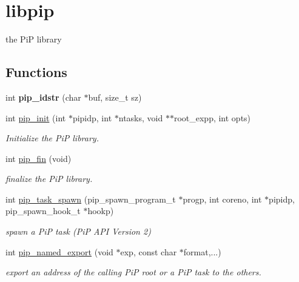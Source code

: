 \hypertarget{group__libpip}{\section{libpip}
\label{group__libpip}
}


the Pi\-P library  


\subsection*{Functions}
\begin{DoxyCompactItemize}
\item 
\hypertarget{group__libpip_ga7c8ad53192b379f9ed5de13d336b8240}{int {\bfseries pip\-\_\-idstr} (char $\ast$buf, size\-\_\-t sz)}\label{group__libpip_ga7c8ad53192b379f9ed5de13d336b8240}

\end{DoxyCompactItemize}
\begin{DoxyCompactItemize}
\item 
int \hyperlink{group__libpip_gad4e0db6c69792b3fa014e3310892a0eb}{pip\-\_\-init} (int $\ast$pipidp, int $\ast$ntasks, void $\ast$$\ast$root\-\_\-expp, int opts)
\begin{DoxyCompactList}\small\item\em Initialize the Pi\-P library. \end{DoxyCompactList}\end{DoxyCompactItemize}
\begin{DoxyCompactItemize}
\item 
int \hyperlink{group__libpip_gac4654282785abb9434ce81573fdf16ed}{pip\-\_\-fin} (void)
\begin{DoxyCompactList}\small\item\em finalize the Pi\-P library. \end{DoxyCompactList}\end{DoxyCompactItemize}
\begin{DoxyCompactItemize}
\item 
int \hyperlink{group__libpip_gad06585ee5975368dd4a3c5014dac1cbb}{pip\-\_\-task\-\_\-spawn} (pip\-\_\-spawn\-\_\-program\-\_\-t $\ast$progp, int coreno, int $\ast$pipidp, pip\-\_\-spawn\-\_\-hook\-\_\-t $\ast$hookp)
\begin{DoxyCompactList}\small\item\em spawn a Pi\-P task (Pi\-P A\-P\-I Version 2) \end{DoxyCompactList}\end{DoxyCompactItemize}
\begin{DoxyCompactItemize}
\item 
int \hyperlink{group__libpip_gab7a5ca6c80e876ef1ea7b42cb2008faa}{pip\-\_\-named\-\_\-export} (void $\ast$exp, const char $\ast$format,...)
\begin{DoxyCompactList}\small\item\em export an address of the calling Pi\-P root or a Pi\-P task to the others. \end{DoxyCompactList}\end{DoxyCompactItemize}
